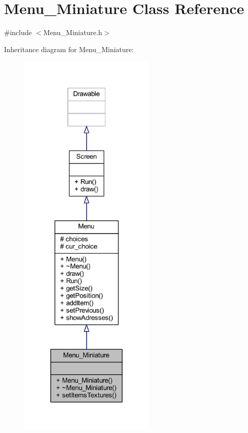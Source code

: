 \hypertarget{class_menu___miniature}{}\section{Menu\+\_\+\+Miniature Class Reference}
\label{class_menu___miniature}


{\ttfamily \#include $<$Menu\+\_\+\+Miniature.\+h$>$}



Inheritance diagram for Menu\+\_\+\+Miniature\+:
\nopagebreak
\begin{figure}[H]
\begin{center}
\leavevmode
\includegraphics[height=550pt]{class_menu___miniature__inherit__graph}
\end{center}
\end{figure}



